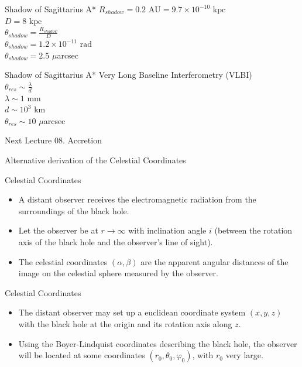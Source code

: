 \documentclass{beamer}
\begin{document}
\begin{darkframes}
\begin{frame}{Shadow of Sagittarius A*}
	$R_{shadow} = 0.2 \textrm{ AU} = 9.7 \times 10^{-10} \textrm{ kpc}$ \\
	\bigskip
	\pause
	$D = 8 \textrm{ kpc} $\\
	\bigskip
	$\theta_{shadow} = \frac{R_{shadow}}{D}$\\
	\pause
	$\theta_{shadow} = 1.2 \times 10^{-11} \textrm{ rad}$\\
	\pause
	$\theta_{shadow} = 2.5$ $\mu$arcsec
\end{frame}

\begin{frame}{Shadow of Sagittarius A*}
	Very Long Baseline Interferometry (VLBI)\\
	\bigskip	
	\pause
	$\theta_{res} \sim \frac{\lambda}{d}$\\
	\bigskip
	\pause
	$\lambda \sim 1 \textrm{ mm}$\\
	\pause
	$d \sim 10^3 \textrm{ km}$\\
	\bigskip
	\pause
	$\theta_{res} \sim 10$ $\mu$arcsec	
\end{frame}

\begin{frame}{Next Lecture}
  	\Large
	{08. Accretion}
\end{frame}






\begin{frame}
	\Large
	{Alternative derivation of the Celestial Coordinates}
\end{frame}

\begin{frame}{Celestial Coordinates}
    \begin{itemize}
    \item A distant observer receives the electromagnetic radiation from the surroundings of the black hole.
    \pause
    \item Let the observer be at $r\rightarrow \infty$  with inclination angle $i$ (between the rotation axis of the black hole and the observer's line of sight).
    \pause
    \item The celestial coordinates $(\alpha, \beta )$ are the apparent angular distances of the image on the celestial sphere measured by the observer.
    \end{itemize}
\end{frame}

\begin{frame}{Celestial Coordinates}
	\begin{itemize}
	\item The distant observer may set up a euclidean coordinate system $(x,y,z)$ with the black hole at the origin and its rotation axis along $z$.
	\pause
	\item Using the Boyer-Lindquist coordinates describing the black hole, the observer will be located at some coordinates $(r_0, \theta_0, \varphi_0)$, with  $r_0$ very large.
    	\end{itemize}
\end{frame}

\end{darkframes}
\end{document}
